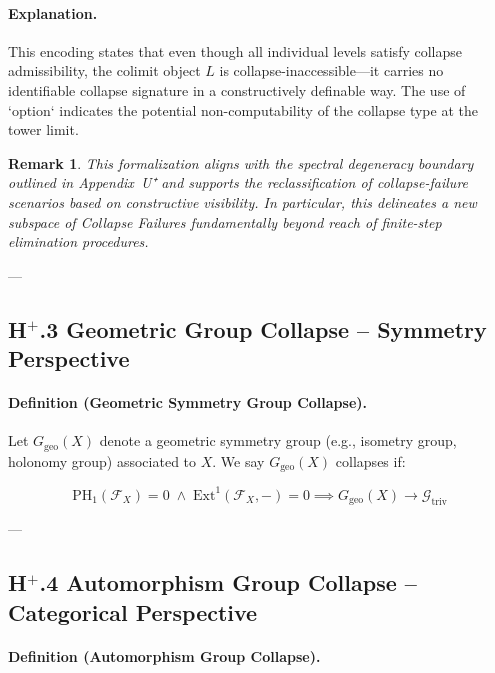 \documentclass[11pt]{article}
\newtheorem{remark}[theorem]{Remark}
\begin{document}
\paragraph{Explanation.}
This encoding states that even though all individual levels satisfy collapse admissibility, the colimit object $L$ is collapse-inaccessible—it carries no identifiable collapse signature in a constructively definable way. The use of `option` indicates the potential non-computability of the collapse type at the tower limit.

\begin{remark}
This formalization aligns with the spectral degeneracy boundary outlined in Appendix~U⁺ and supports the reclassification of collapse-failure scenarios based on constructive visibility. In particular, this delineates a new subspace of Collapse Failures fundamentally beyond reach of finite-step elimination procedures.
\end{remark}



---

\subsection*{H$^{+}$.3 Geometric Group Collapse – Symmetry Perspective}

\paragraph{Definition (Geometric Symmetry Group Collapse).}

Let $G_{\mathrm{geo}}(X)$ denote a geometric symmetry group (e.g., isometry group, holonomy group) associated to $X$. We say $G_{\mathrm{geo}}(X)$ collapses if:

\[
\mathrm{PH}_1(\mathcal{F}_X) = 0 \;\land\; \mathrm{Ext}^1(\mathcal{F}_X, -) = 0 \implies G_{\mathrm{geo}}(X) \longrightarrow \mathcal{G}_{\mathrm{triv}}
\]

---

\subsection*{H$^{+}$.4 Automorphism Group Collapse – Categorical Perspective}

\paragraph{Definition (Automorphism Group Collapse).}
\end{document}
